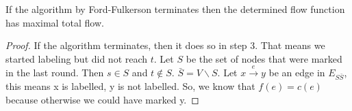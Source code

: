 \begin{lemma}
If the algorithm by Ford-Fulkerson terminates then the determined flow function has maximal total flow.
\end{lemma}

\begin{proof}
If the algorithm terminates, then it does so in step 3. That means we started labeling but did not reach $t$. Let $S$ be the set of nodes that were marked in the last round. Then $s \in S$ and $t \notin S$. $\bar{S} = V \backslash S$. Let $x \xrightarrow{e} y$ be an edge in $E_{S\bar{S}}$, this means x is labelled, y is not labelled. So, we know that $f(e) = c(e)$ because otherwise we could have marked y.
\end{proof}